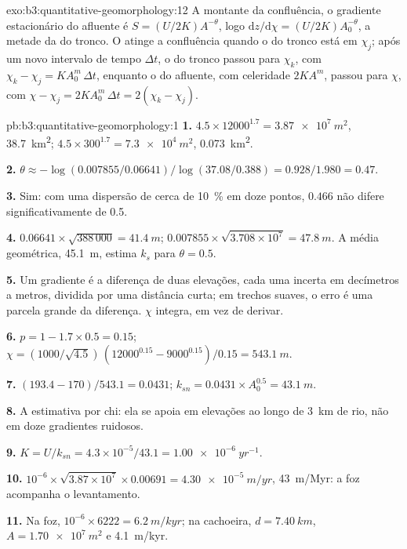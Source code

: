 \begin{solution}{exo:b3:quantitative-geomorphology:12}
A montante da confluência, o gradiente estacionário do afluente é $S = (U/2K)A^{-\theta}$,
logo $\mathrm{d}z/\mathrm{d}\chi = (U/2K)A_0^{-\theta}$, a metade da do tronco.
O  atinge a confluência quando o do tronco está em $\chi_j$; após um
novo intervalo de tempo $\Delta t$, o do tronco passou para $\chi_k$, com $\chi_k -
\chi_j = K A_0^m\,\Delta t$, enquanto o do afluente, com celeridade $2KA^m$,
passou para $\chi$, com $\chi - \chi_j = 2KA_0^m\,\Delta t = 2(\chi_k -
\chi_j)$.
\end{solution}

\begin{solution}{pb:b3:quantitative-geomorphology:1}
\textbf{1.} $4.5\times12000^{1.7} = \qty{3.87e7}{m^2}$, \qty{38.7}{km^2};
$4.5\times300^{1.7} = \qty{7.3e4}{m^2}$, \qty{0.073}{km^2}.

\textbf{2.} $\theta \approx -\log(0.007855/0.06641)/\log(37.08/0.388) =
0.928/1.980 = 0.47$.

\textbf{3.} Sim: com uma dispersão de cerca de \qty{10}{\percent} em doze pontos,
$0.466$ não difere significativamente de 0.5.

\textbf{4.} $0.06641\times\sqrt{388\,000} = \qty{41.4}{m}$;
$0.007855\times\sqrt{3.708\times10^7} = \qty{47.8}{m}$. A média geométrica,
\qty{45.1}{m}, estima $k_s$ para $\theta = 0.5$.

\textbf{5.} Um gradiente é a diferença de duas elevações, cada uma incerta
em decímetros a metros, dividida por uma distância curta; em trechos suaves, o
erro é uma parcela grande da diferença. $\chi$ integra, em vez de
derivar.

\textbf{6.} $p = 1 - 1.7\times0.5 = 0.15$; $\chi = (1000/\sqrt{4.5})\,
(12000^{0.15} - 9000^{0.15})/0.15 = \qty{543.1}{m}$.

\textbf{7.} $(193.4 - 170)/543.1 = 0.0431$; $k_{sn} = 0.0431\times A_0^{0.5}
= \qty{43.1}{m}$.

\textbf{8.} A estimativa por chi: ela se apoia em elevações ao longo de \qty{3}{km} de
rio, não em doze gradientes ruidosos.

\textbf{9.} $K = U/k_{sn} = 4.3\times10^{-5}/43.1 = \qty{1.00e-6}{yr^{-1}}$.

\textbf{10.} $10^{-6}\times\sqrt{3.87\times10^7}\times0.00691 =
\qty{4.30e-5}{m/yr}$, \qty{43}{m/Myr}: a foz acompanha o
levantamento.

\textbf{11.} Na foz, $10^{-6}\times6222 = \qty{6.2}{m/kyr}$; na
cachoeira, $d = \qty{7.40}{km}$, $A = \qty{1.70e7}{m^2}$ e
\qty{4.1}{m/kyr}.


\end{solution}
